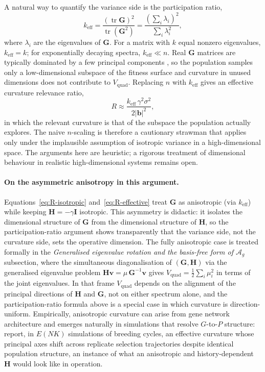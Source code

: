 \documentclass[9pt,twocolumn,twoside,lineno]{gsajnl}
\newcommand{\vect}[1]{\boldsymbol{#1}}
\newcommand{\mat}[1]{\mathbf{#1}}
\newcommand{\tr}{\ensuremath{\operatorname{tr}}\xspace}
\newcommand{\Ag}{\ensuremath{\mathcal{A}_{g}}\xspace}
\newcommand{\Vquad}{\ensuremath{V_{\text{quad}}}\xspace}
\newcommand{\keff}{\ensuremath{k_{\mathrm{eff}}}\xspace}
\begin{document}
A natural way to quantify the variance side is the participation ratio,
\begin{equation}
\keff = \frac{(\tr \mat{G})^2}{\tr(\mat{G}^2)} = \frac{\left(\sum_i \lambda_i\right)^2}{\sum_i \lambda_i^2},
\label{eq:keff}
\end{equation}
where $\lambda_i$ are the eigenvalues of $\mat{G}$. For a matrix with $k$ equal nonzero eigenvalues, $\keff = k$; for exponentially decaying spectra, $\keff \ll n$. Real $\mat{G}$ matrices are typically dominated by a few principal components \citep{Blows2007, Kirkpatrick2009, Walsh2009}, so the population samples only a low-dimensional subspace of the fitness surface and curvature in unused dimensions does not contribute to $\Vquad$. Replacing $n$ with $\keff$ gives an effective curvature relevance ratio,
\begin{equation}
R \approx \frac{\keff\, \gamma^2 \sigma^2}{2 |\vect{b}|^2},
\label{eq:R-effective}
\end{equation}
in which the relevant curvature is that of the subspace the population actually explores. The naive $n$-scaling is therefore a cautionary strawman that applies only under the implausible assumption of isotropic variance in a high-dimensional space. The arguments here are heuristic; a rigorous treatment of dimensional behaviour in realistic high-dimensional systems remains open.

\paragraph{On the asymmetric anisotropy in this argument.}
Equations~\eqref{eq:R-isotropic} and~\eqref{eq:R-effective} treat $\mat{G}$ as anisotropic (via $\keff$) while keeping $\mat{H}=-\gamma\mat{I}$ isotropic. This asymmetry is didactic: it isolates the dimensional structure of $\mat{G}$ from the dimensional structure of $\mat{H}$, so the participation-ratio argument shows transparently that the variance side, not the curvature side, sets the operative dimension. The fully anisotropic case is treated formally in the \textit{Generalised eigenvalue rotation and the basis-free form of \Ag} subsection, where the simultaneous diagonalisation of $(\mat{G},\mat{H})$ via the generalised eigenvalue problem $\mat{H}\vect{v}=\mu\,\mat{G}^{-1}\vect{v}$ gives $\Vquad = \tfrac{1}{2}\sum_i \mu_i^2$ in terms of the joint eigenvalues. In that frame $\Vquad$ depends on the alignment of the principal directions of $\mat{H}$ and $\mat{G}$, not on either spectrum alone, and the participation-ratio formula above is a special case in which curvature is direction-uniform. Empirically, anisotropic curvature can arise from gene network architecture and emerges naturally in simulations that resolve $G$-to-$P$ structure: \citet{Technow2026} report, in $E(NK)$ simulations of breeding cycles, an effective curvature whose principal axes shift across replicate selection trajectories despite identical population structure, an instance of what an anisotropic and history-dependent $\mat{H}$ would look like in operation.
\end{document}
